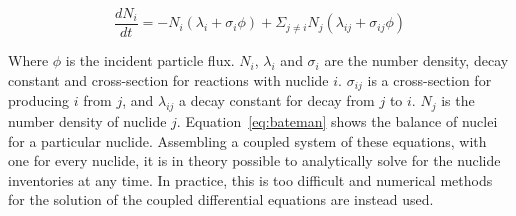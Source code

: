 \begin{equation}
  \label{eq:bateman}
  \frac{dN_{i}}{dt} = -N_{i}(\lambda_{i} + \sigma_{i}\phi) + \Sigma_{j \neq i}N_{j}(\lambda_{ij} + \sigma_{ij}\phi)
\end{equation}

Where $\phi$ is the incident particle flux. $N_{i}$, $\lambda_{i}$ and $\sigma_{i}$ are the number density, decay constant and cross-section for reactions with nuclide $i$. $\sigma_{ij}$ is a cross-section for producing $i$ from $j$, and $\lambda_{ij}$ a decay constant for decay from $j$ to $i$. $N_{j}$ is the number density of nuclide $j$. Equation~\ref{eq:bateman} shows the balance of nuclei for a particular nuclide. Assembling a coupled system of these equations, with one for every nuclide, it is in theory possible to analytically solve for the nuclide inventories at any time. In practice, this is too difficult and numerical methods for the solution of the coupled differential equations are instead used. 

